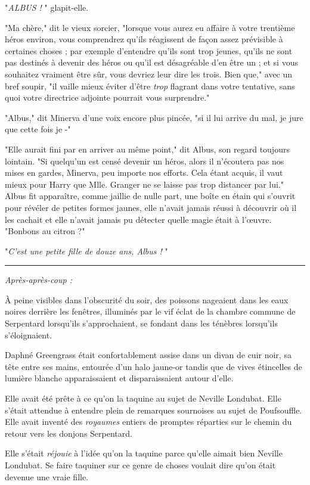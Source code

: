 "\emph{ALBUS !} " glapit-elle.

"Ma chère," dit le vieux sorcier, "lorsque vous aurez eu affaire à votre trentième héros environ, vous comprendrez qu'ils réagissent de façon assez prévisible à certaines choses ; par exemple d'entendre qu'ils sont trop jeunes, qu'ils ne sont pas destinés à devenir des héros ou qu'il est désagréable d'en être un ; et si vous souhaitez vraiment être sûr, vous devriez leur dire les trois. Bien que," avec un bref soupir, "il vaille mieux éviter d'être \emph{trop}  flagrant dans votre tentative, sans quoi votre directrice adjointe pourrait vous surprendre."

"Albus," dit Minerva d'une voix encore plus pincée, "si il lui arrive du mal, je jure que cette fois je -"

"Elle aurait fini par en arriver au même point," dit Albus, son regard toujours lointain. "Si quelqu'un est censé devenir un héros, alors il n'écoutera pas nos mises en gardes, Minerva, peu importe nos efforts. Cela étant acquis, il vaut mieux pour Harry que Mlle. Granger ne se laisse pas trop distancer par lui." Albus fit apparaître, comme jaillie de nulle part, une boîte en étain qui s'ouvrit pour révéler de petites formes jaunes, elle n'avait jamais réussi à découvrir où il les cachait et elle n'avait jamais pu détecter quelle magie était à l'œuvre. "Bonbons au citron ?"

"\emph{C'est une petite fille de douze ans, Albus !} "
\par\noindent\rule{\textwidth}{0.4pt}
\emph{Après-après-coup :} 

À peine visibles dans l'obscurité du soir, des poissons nageaient dans les eaux noires derrière les fenêtres, illuminés par le vif éclat de la chambre commune de Serpentard lorsqu'ils s'approchaient, se fondant dans les ténèbres lorsqu'ils s'éloignaient.

Daphné Greengrass était confortablement assise dans un divan de cuir noir, sa tête entre ses mains, entourée d'un halo jaune-or tandis que de vives étincelles de lumière blanche apparaissaient et disparaissaient autour d'elle.

Elle avait été prête à ce qu'on la taquine au sujet de Neville Londubat. Elle s'était attendue à entendre plein de remarques sournoises au sujet de Poufsouffle. Elle avait inventé des \emph{royaumes } entiers de promptes réparties sur le chemin du retour vers les donjons Serpentard.

Elle s'était \emph{réjouie } à l'idée qu'on la taquine parce qu'elle aimait bien Neville Londubat. Se faire taquiner sur ce genre de choses voulait dire qu'on était devenue une vraie fille.

